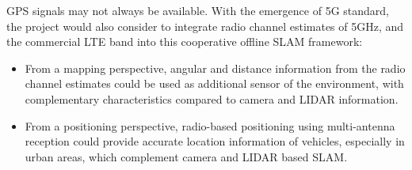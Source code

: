 GPS signals may not always be available. With the emergence of 5G
standard, the project would also consider to integrate radio channel
estimates of 5GHz, and the commercial LTE
band into this cooperative offline \gls{SLAM} framework:
\begin{itemize}
\item   From a mapping perspective, angular and distance information
  from the radio channel estimates could be used as additional sensor
  of the environment, with complementary characteristics compared to
  camera and LIDAR information.
\item From a positioning perspective, radio-based positioning using
multi-antenna reception could provide accurate location information of
vehicles, especially in urban areas, which complement camera and LIDAR
based SLAM.
\end{itemize}

